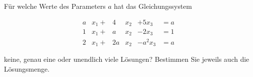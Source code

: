 \subsubsection{}  %
Für welche Werte des Parameters \( a \) hat das Gleichungssystem

\begin{equation*}
    \begin{aligned}
        a&x_1 +& 4&x_2 &+ 5x_3 &= a\\
        1&x_1 +& a&x_2 &- 2x_3 &= 1\\
        2&x_1 +& 2a&x_2 &- a^2x_3 &= a
    \end{aligned}   
\end{equation*}

keine, genau eine oder unendlich viele Lösungen? Bestimmen Sie jeweils auch die Lösungsmenge.

\vspace{1\baselineskip}

